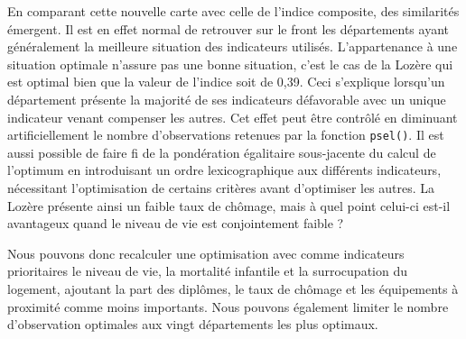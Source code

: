 \documentclass[
  french,
  11pt,
  a4paper,
]{article}
\begin{document}
En comparant cette nouvelle carte avec celle de l'indice composite, des
similarités émergent. Il est en effet normal de retrouver sur le front
les départements ayant généralement la meilleure situation des
indicateurs utilisés. L'appartenance à une situation optimale n'assure
pas une bonne situation, c'est le cas de la Lozère qui est optimal bien
que la valeur de l'indice soit de 0,39. Ceci s'explique lorsqu'un
département présente la majorité de ses indicateurs défavorable avec un
unique indicateur venant compenser les autres. Cet effet peut être
contrôlé en diminuant artificiellement le nombre d'observations retenues
par la fonction \texttt{psel()}. Il est aussi possible de faire fi de la
pondération égalitaire sous-jacente du calcul de l'optimum en
introduisant un ordre lexicographique aux différents indicateurs,
nécessitant l'optimisation de certains critères avant d'optimiser les
autres. La Lozère présente ainsi un faible taux de chômage, mais à quel
point celui-ci est-il avantageux quand le niveau de vie est
conjointement faible ?

Nous pouvons donc recalculer une optimisation avec comme indicateurs
prioritaires le niveau de vie, la mortalité infantile et la
surrocupation du logement, ajoutant la part des diplômes, le taux de
chômage et les équipements à proximité comme moins importants. Nous
pouvons également limiter le nombre d'observation optimales aux vingt
départements les plus optimaux.
\end{document}
